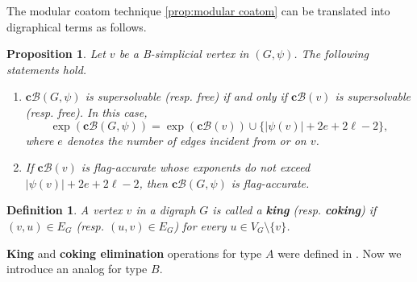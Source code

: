 \documentclass[11pt]{article}
\newtheorem{proposition}[theo]{Proposition}
\newtheorem{definition}[theo]{Definition}
\theoremstyle{definition}
\numberwithin{equation}{section}
\newcommand{\B}{\mathcal{B}}
\newcommand{\cc}{\mathbf{c}}
\newcommand{\tbf}{\textbf}
\begin{document}
The modular coatom technique \ref{prop:modular coatom} can be translated into digraphical terms as follows.
\begin{proposition}
\label{prop:B-simplicial}
Let $ v $ be a B-simplicial vertex in $ (G,\psi) $. 
The following statements hold. 
\begin{enumerate}[(1)]
\item[(i)]   $ \mathbf{c}\B(G,\psi) $ is supersolvable (resp. free) if and only if $\cc\B(v)$ is supersolvable (resp.  free). 
In this case, 
$$\exp ( \mathbf{c}\B(G,\psi)  )   = \exp  (\cc\B(v)  )  \cup \{|\psi(v)|+2e+2\ell-2\},$$ where  $ e $ denotes the number of edges incident from or on $ v $.
\item[(ii)]  If $\cc\B(v)$ is  flag-accurate whose exponents do not exceed  $|\psi(v)|+2e+2\ell-2$, then $ \mathbf{c}\B(G,\psi) $ is  flag-accurate.
\end{enumerate}
\end{proposition}





\begin{definition}
A vertex $ v $ in a digraph $ G $ is called a \textbf{king} (resp. \textbf{coking}) if $ (v,u) \in E_{G} $ (resp. $ (u,v) \in E_{G} $) for every $ u \in V_{G}\setminus\{v\} $. 
\end{definition}

 \tbf{King} and \tbf{coking elimination} operations for type $A$ were defined in \cite[Definition 2.14]{ATT24}.
Now we introduce an analog for type $B$. 
\end{document}
